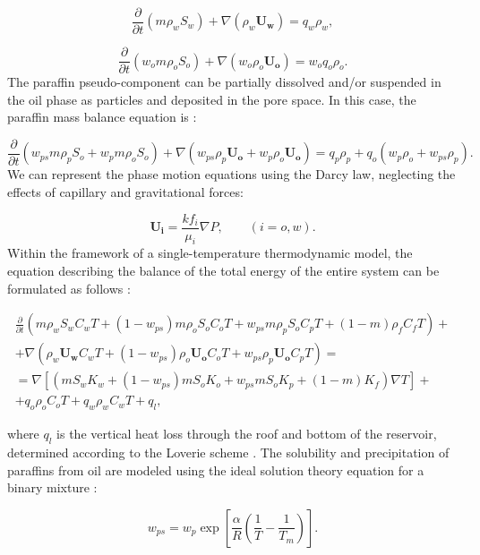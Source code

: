 \documentclass[
11pt,%
tightenlines,%
twoside,%
onecolumn,%
nofloats,%
nobibnotes,%
nofootinbib,%
superscriptaddress,%
noshowpacs,%
centertags]%
{revtex4-2}
\begin{document}
\begin{equation}\label{eq1}
\frac{\partial }{\partial t}(m \rho_w S_w ) + \nabla(\rho_w \mathbf{U_w}) = q_w \rho_w,
\end{equation}

\begin{equation}\label{eq2}
\frac{\partial }{\partial t}(w_o  m \rho_o S_o) + \nabla(w_o \rho_o \mathbf{U_o}) = w_o q_o \rho_o.
\end{equation}
The paraffin pseudo-component can be partially dissolved and/or suspended in the oil phase as particles and deposited in the pore space. In this case, the paraffin mass balance equation is \cite{6}:

\begin{equation}\label{eq3}
\frac{\partial}{\partial t}(w_{ps} m \rho_p S_o + w_p  m \rho_o S_o) + \nabla(w_{ps}  \rho_p \mathbf{U_o} + w_p \rho_o \mathbf{U_o}) = q_p \rho_p + q_o (w_p \rho_o + w_{ps} \rho_p).
\end{equation}
We can represent the phase motion equations using the Darcy law, neglecting the effects of capillary and gravitational forces:

\begin{equation}\label{eq4}
\mathbf{U_i} = \frac{k f_i}{\mu_i} \nabla P,  \qquad (i=o,w).
\end{equation}
Within the framework of a single-temperature thermodynamic model, the equation describing the balance of the total energy of the entire system can be formulated as follows \cite{4}:

\begin{multline}\label{eq5}
\frac{\partial }
{\partial t}(m \rho_w S_w C_w T +(1-w_{ps})m \rho_o S_o C_o T + 
w_{ps}m \rho_p S_o C_p T +(1-m) \rho_f C_f T) + 
\\
+\nabla(\rho_w \mathbf{U_w} C_w T + (1-w_{ps}) \rho_o \mathbf{U_o} C_o T + w_{ps}\rho_p \mathbf{U_o} C_p T) = 
\\
=\nabla [(m S_w K_w + (1-w_{ps}) m S_o K_o  + w_{ps} m S_o K_p + (1-m) K_f) \nabla T ] + 
\\
+ q_o \rho_o C_o T + q_w \rho_w C_w T + q_l,
\end{multline}

where $q_l$ is the vertical heat loss through the roof and bottom of the reservoir, determined according to the Loverie scheme \cite{13}. The solubility and precipitation of paraffins from oil are modeled using the ideal solution theory equation for a binary mixture \cite{4}:

\begin{equation} \label{eq6}
w_{ps} = w_p \exp[\frac{\alpha}{R}(\frac{1}{T} - \frac{1}{T_m})]. 
\end{equation}
\end{document}
